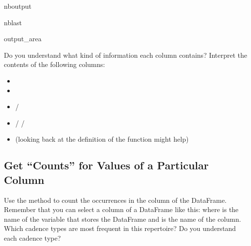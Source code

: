 \documentclass[letterpaper,10pt,english]{sphinxmanual}
\begin{document}
\begin{sphinxuseclass}{nboutput}
\begin{sphinxuseclass}{nblast}
{\begin{sphinxuseclass}{output_area}
\begin{sphinxuseclass}{}
\end{sphinxuseclass}
\end{sphinxuseclass}
}

\end{sphinxuseclass}
\end{sphinxuseclass}
\sphinxAtStartPar
Do you understand what kind of information each column contains? Interpret the contents of the following columns:
\begin{itemize}
\item {} 
\sphinxAtStartPar
{}

\item {} 
\sphinxAtStartPar
{}

\item {} 
\sphinxAtStartPar
{} / 

\item {} 
\sphinxAtStartPar
{} /  / 

\item {} 
\sphinxAtStartPar
{} (looking back at the definition of the  function might help)

\end{itemize}


\subsection{Get “Counts” for Values of a Particular Column}
\label{\detokenize{exercises/02_exercise:Get-_u201cCounts_u201d-for-Values-of-a-Particular-Column}}
\sphinxAtStartPar
Use the  method to count the occurrences in the  column of the DataFrame. Remember that you can select a column of a DataFrame like this:  where  is the name of the variable that stores the DataFrame and  is the name of the column. Which cadence types are most frequent in this repertoire? Do you understand each cadence type?
\end{document}
